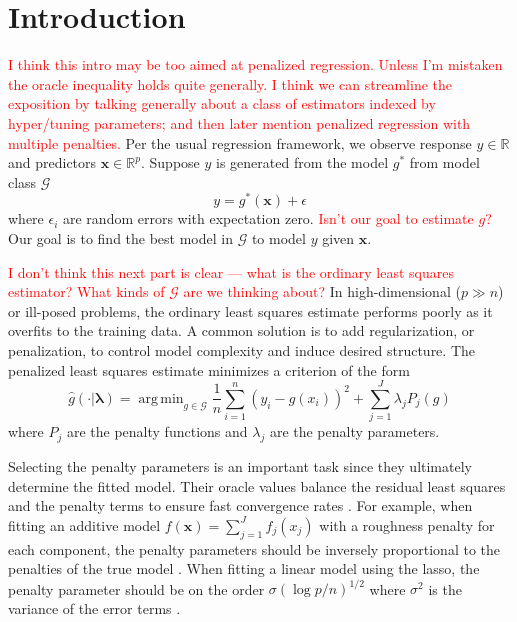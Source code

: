 \documentclass[12pt]{article}
\DeclareMathOperator*{\argmin}{arg\,min}
\begin{document}
\section{Introduction}

\textcolor{red}{I think this intro may be too aimed at penalized regression. Unless I'm mistaken the oracle inequality holds quite generally. I think we can streamline the exposition by talking generally about a class of estimators indexed by hyper/tuning parameters; and then later mention penalized regression with multiple penalties.} Per the usual regression framework, we observe response $y \in \mathbb{R}$ and predictors $\boldsymbol {x} \in \mathbb{R}^p$. Suppose $y$ is generated from the model $g^*$ from model class $\mathcal{G}$
\begin{equation}
y = g^*(\boldsymbol x) + \epsilon
\end{equation}
where $\epsilon_i$ are random errors with expectation zero. \textcolor{red}{Isn't our goal to estimate $g$?} Our goal is to find the best model in $\mathcal{G}$ to model $y$ given $\boldsymbol x$.

\textcolor{red}{I don't think this next part is clear --- what is the ordinary least squares estimator? What kinds of $\mathcal{G}$ are we thinking about?} In high-dimensional ($p \gg n$) or ill-posed problems, the ordinary least squares estimate performs poorly as it overfits to the training data. A common solution is to add regularization, or penalization, to control model complexity and induce desired structure. The penalized least squares estimate minimizes a criterion of the form
\begin{equation}
\label{intro_train_criterion}
\hat{g}(\cdot | \boldsymbol \lambda) = \argmin_{g\in \mathcal{G}} \frac{1}{n} \sum_{i=1}^n \left (y_i -  g(x_i) \right )^2 + \sum_{j=1}^J \lambda_j P_j(g)
\end{equation}
where $P_j$ are the penalty functions and $\lambda_j$ are the penalty parameters.

Selecting the penalty parameters is an important task since they ultimately determine the fitted model. Their oracle values balance the residual least squares and the penalty terms to ensure fast convergence rates \citep{van2000empirical}. For example, when fitting an additive model $f(\boldsymbol x) = \sum_{j=1}^J f_j(x_j)$ with a roughness penalty for each component, the penalty parameters should be inversely proportional to the penalties of the true model \citep{van2014additive}. When fitting a linear model using the lasso, the penalty parameter should be on the order $\sigma (\log p /n )^{1/2}$ where $\sigma^2$ is the variance of the error terms \citep{buhlmann2011statistics}.
\end{document}
